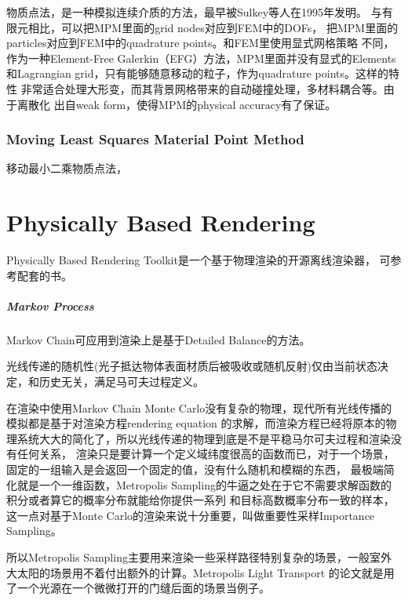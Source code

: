 物质点法，是一种模拟连续介质的方法，最早被Sulkey等人在1995年发明。
与有限元相比，可以把MPM里面的grid nodes对应到FEM中的DOFs，
把MPM里面的particles对应到FEM中的quadrature points。和FEM里使用显式网格策略
不同，作为一种Element-Free Galerkin（EFG）方法，MPM里面并没有显式的Elements
和Lagrangian grid，只有能够随意移动的粒子，作为quadrature points。这样的特性
非常适合处理大形变，而其背景网格带来的自动碰撞处理，多材料耦合等。由于离散化
出自weak form，使得MPM的physical accuracy有了保证。

\subsection{Moving Least Squares Material Point Method}

移动最小二乘物质点法，

\chapter{Physically Based Rendering}

Physically Based Rendering Toolkit是一个基于物理渲染的开源离线渲染器， 可参考配套的书\cite{PBR3ed}。



\paragraph{Markov Process}

Markov Chain可应用到渲染上是基于Detailed Balance的方法。

光线传递的随机性(光子抵达物体表面材质后被吸收或随机反射)仅由当前状态决定，和历史无关，满足马可夫过程定义。

在渲染中使用Markov Chain Monte Carlo没有复杂的物理，现代所有光线传播的模拟都是基于对渲染方程rendering equation
的求解，而渲染方程已经将原本的物理系统大大的简化了，所以光线传递的物理到底是不是平稳马尔可夫过程和渲染没有任何关系，
渲染只是要计算一个定义域纬度很高的函数而已，对于一个场景，固定的一组输入是会返回一个固定的值，没有什么随机和模糊的东西，
最极端简化就是一个一维函数，Metropolis Sampling的牛逼之处在于它不需要求解函数的积分或者算它的概率分布就能给你提供一系列
和目标高数概率分布一致的样本，这一点对基于Monte Carlo的渲染来说十分重要，叫做重要性采样Importance Sampling。

所以Metropolis Sampling主要用来渲染一些采样路径特别复杂的场景，一般室外大太阳的场景用不着付出额外的计算。Metropolis Light Transport
的论文就是用了一个光源在一个微微打开的门缝后面的场景当例子。
